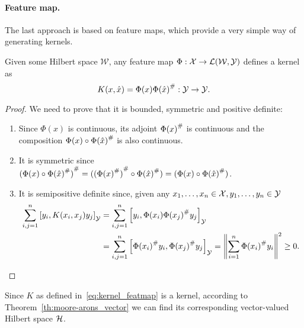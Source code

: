 \paragraph*{Feature map.}
The last approach is based on feature maps, which provide a very simple way of generating kernels.
\begin{lemma}
    Given some Hilbert space $\mathcal{W}$, any feature map $\Phi: \mathcal{X} \to \mathcal{L}(\mathcal{W}, \mathcal{Y})$ defines a kernel as
\begin{equation}
    \label{eq:kernel_featmap}
    K(x, \hat{x}) = \Phi(x) \adj{\Phi(\hat{x})}: \Yspace \to \Yspace .
\end{equation}
\end{lemma}
\begin{proof} We need to prove that it is bounded, symmetric and positive definite:
    \begin{enumerate}
        \item Since $\Phi(x)$ is continuous, its adjoint ${\Phi(x)}^{\#}$ is continuous and the composition $\Phi(x) \circ {\Phi(\hat{x})}^{\#}$ is also continuous.
        \item It is symmetric since  ${(\Phi(x) \circ {\Phi(\hat{x})}^{\#})}^{\#} = ({({\Phi(x)}^{\#})}^{\#} \circ {\Phi(\hat{x})}^{\#}) = (\Phi(x) \circ {\Phi(\hat{x})}^{\#}) $.
        \item It is semipositive definite since, given any $x_1, \ldots, x_n \in \mathcal{X},  y_1, \ldots, y_n \in \mathcal{Y}$
        \begin{equation}
            \nonumber
            \begin{aligned}
                \sum_{i, j =1}^n \left[ y_i, K(x_i, x_j) y_j \right]_\mathcal{Y} &= \sum_{i, j =1}^n \left[ y_i,  \Phi(x_i) {\Phi(x_j)}^{\#} y_j \right]_\mathcal{Y} \\
                & = \sum_{i, j =1}^n \left[ {\Phi(x_i)}^{\#} y_i,  {\Phi(x_j)}^{\#} y_j \right]_\mathcal{Y} = \left\lVert\sum_{i=1}^n {\Phi(x_i)}^{\#} y_i\right\rVert^2 \geq 0 .
            \end{aligned}
        \end{equation}
    \end{enumerate}
\end{proof}
Since $K$ as defined in~\eqref{eq:kernel_featmap} is a kernel, according to Theorem~\ref{th:moore-arons_vector} we can find its corresponding vector-valued Hilbert space $\mathcal{H}$.

